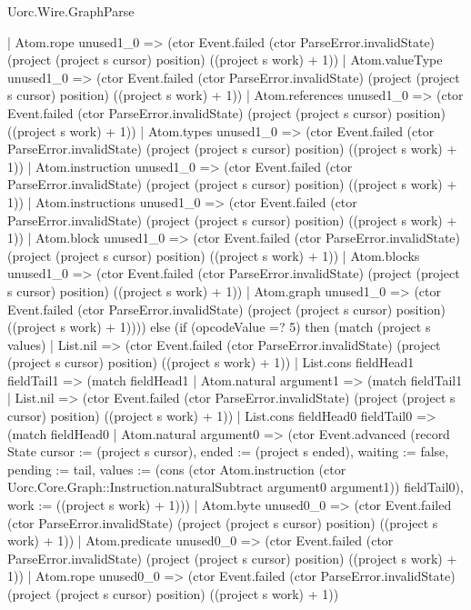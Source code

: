 \begin{lexlean}{Uorc.Wire.GraphParse}
\begin{semanticmodule}
{          | Atom.rope unused1_0 => (ctor Event.failed (ctor ParseError.invalidState) (project (project s cursor) position) ((project s work) + 1))
          | Atom.valueType unused1_0 => (ctor Event.failed (ctor ParseError.invalidState) (project (project s cursor) position) ((project s work) + 1))
          | Atom.references unused1_0 => (ctor Event.failed (ctor ParseError.invalidState) (project (project s cursor) position) ((project s work) + 1))
          | Atom.types unused1_0 => (ctor Event.failed (ctor ParseError.invalidState) (project (project s cursor) position) ((project s work) + 1))
          | Atom.instruction unused1_0 => (ctor Event.failed (ctor ParseError.invalidState) (project (project s cursor) position) ((project s work) + 1))
          | Atom.instructions unused1_0 => (ctor Event.failed (ctor ParseError.invalidState) (project (project s cursor) position) ((project s work) + 1))
          | Atom.block unused1_0 => (ctor Event.failed (ctor ParseError.invalidState) (project (project s cursor) position) ((project s work) + 1))
          | Atom.blocks unused1_0 => (ctor Event.failed (ctor ParseError.invalidState) (project (project s cursor) position) ((project s work) + 1))
          | Atom.graph unused1_0 => (ctor Event.failed (ctor ParseError.invalidState) (project (project s cursor) position) ((project s work) + 1)))) else (if (opcodeValue =? 5) then (match (project s values)
        | List.nil => (ctor Event.failed (ctor ParseError.invalidState) (project (project s cursor) position) ((project s work) + 1))
        | List.cons fieldHead1 fieldTail1 => (match fieldHead1
          | Atom.natural argument1 => (match fieldTail1
            | List.nil => (ctor Event.failed (ctor ParseError.invalidState) (project (project s cursor) position) ((project s work) + 1))
            | List.cons fieldHead0 fieldTail0 => (match fieldHead0
              | Atom.natural argument0 => (ctor Event.advanced (record State {cursor := (project s cursor), ended := (project s ended), waiting := false, pending := tail, values := (cons (ctor Atom.instruction (ctor Uorc.Core.Graph::Instruction.naturalSubtract argument0 argument1)) fieldTail0), work := ((project s work) + 1)}))
              | Atom.byte unused0_0 => (ctor Event.failed (ctor ParseError.invalidState) (project (project s cursor) position) ((project s work) + 1))
              | Atom.predicate unused0_0 => (ctor Event.failed (ctor ParseError.invalidState) (project (project s cursor) position) ((project s work) + 1))
              | Atom.rope unused0_0 => (ctor Event.failed (ctor ParseError.invalidState) (project (project s cursor) position) ((project s work) + 1))
}
\end{semanticmodule}
\end{lexlean}
